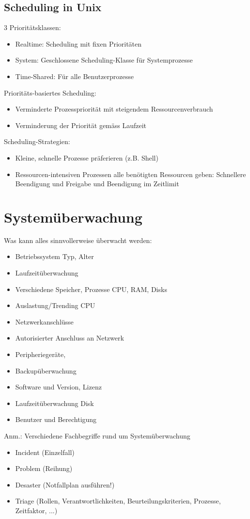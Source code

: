 \documentclass[a4paper, 10pt]{article}
\begin{document}
\subsection{Scheduling in Unix}
3 Priorit\"atsklassen:
\begin{itemize}
\item Realtime: Scheduling mit fixen Priorit\"aten
\item System: Geschlossene Scheduling-Klasse f\"ur Systemprozesse
\item Time-Shared: F\"ur alle Benutzerprozesse
\end{itemize}

Priorit\"ats-basiertes Scheduling:
\begin{itemize}
\item Verminderte Prozesspriorit\"at mit steigendem Ressourcenverbrauch
\item Verminderung der Priorit\"at gem\"ass Laufzeit
\end{itemize}
Scheduling-Strategien:
\begin{itemize}
\item Kleine, schnelle Prozesse pr\"aferieren (z.B. Shell)
\item Ressourcen-intensiven Prozessen alle ben\"otigten Ressourcen geben:
Schnellere Beendigung und Freigabe und Beendigung im Zeitlimit
\end{itemize}

\newpage
\section{System\"uberwachung}
Was kann alles sinnvollerweise \"uberwacht werden:
\begin{itemize}
\item Betriebssystem Typ, Alter
\item Laufzeit\"uberwachung
\item Verschiedene Speicher, Prozesse CPU, RAM, Disks
\item Auslastung/Trending CPU
\item Netzwerkanschl\"usse
\item Autorisierter Anschluss an Netzwerk
\item Peripherieger\"ate, 
\item Backup\"uberwachung
\item Software und Version, Lizenz
\item Laufzeit\"uberwachung Disk
\item Benutzer und Berechtigung
\end{itemize}

Anm.: Verschiedene Fachbegriffe rund um System\"uberwachung
\begin{itemize}
\item Incident (Einzelfall)
\item Problem (Reihung)
\item Desaster (Notfallplan ausf\"uhren!)
\item Triage (Rollen, Verantwortlichkeiten, Beurteilungskriterien, Prozesse, Zeitfaktor, ...)
\end{itemize}
\end{document}
